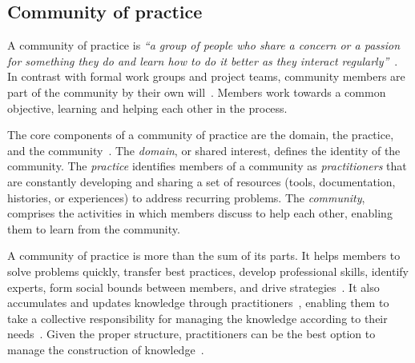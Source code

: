 \subsection{Community of practice}

    A community of practice is \textit{``a group of people who share a concern or a passion for something they do and learn how to do it better as they interact regularly''}~\cite{Wenger2000}.
    In contrast with formal work groups and project teams, community members are part of the community by their own will~\cite{Wenger2000}.
    Members work towards a common objective, learning and helping each other in the process.

    The core components of a community of practice are the domain, the practice, and the community~\cite{Wenger2011}.
    The \textit{domain}, or shared interest, defines the identity of the community.
    The \textit{practice} identifies members of a community as \textit{practitioners} that are constantly developing and sharing a set of resources (tools, documentation, histories, or experiences) to address recurring problems. 
    The \textit{community}, comprises the activities in which members discuss to help each other, enabling them to learn from the community.

    A community of practice is more than the sum of its parts.
    It helps members to solve problems quickly, transfer best practices, develop professional skills, identify experts, form social bounds between members, and drive strategies~\cite{Wenger2011, Storey2014}.
    It also accumulates and updates knowledge through practitioners~\cite{Wenger2010}, enabling them to take a collective responsibility for managing the knowledge according to their needs~\cite{Wenger2011}.
    Given the proper structure, practitioners can be the best option to manage the construction of knowledge~\cite{Wenger2011}.


